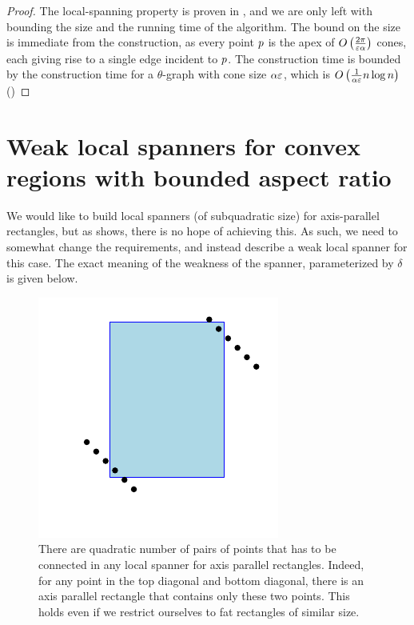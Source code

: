 \documentclass[12pt]{article}%
\begin{document}
\begin{proof}
	The local-spanning property is proven in , and we are only left with bounding the size and the running time of the algorithm. The bound on the size is immediate from the construction, as every point $p$ is the apex of $O\left( \frac{2\pi}{\varepsilon\alpha} \right)$ cones, each giving rise to a single edge incident to $p$.
	The construction time is bounded by the construction time for a $\theta$-graph with cone size $\alpha\varepsilon$, which is $O\left(\frac{1}{\alpha\varepsilon}n\log n\right)$ (\cite{c-aaspmp-87})
\end{proof}






\section{Weak local spanners for convex regions %
   with bounded aspect ratio}

We would like to build local spanners (of subquadratic size) for
axis-parallel rectangles, but as  shows, there
is no hope of achieving this. As such, we need to somewhat change the
requirements, and instead describe a weak local spanner for this case.
The exact meaning of the weakness of the spanner, parameterized by
$\delta$ is given below.

\begin{figure}
    \centerline{\includegraphics{figs/local_rectangles}}
    \caption{There are quadratic number of pairs of points that has to
       be connected in any local spanner for axis parallel
       rectangles. Indeed, for any point in the top diagonal and
       bottom diagonal, there is an axis parallel rectangle that
       contains only these two points. This holds even if we restrict
       ourselves to fat rectangles of similar size.}
\end{figure}
\end{document}
